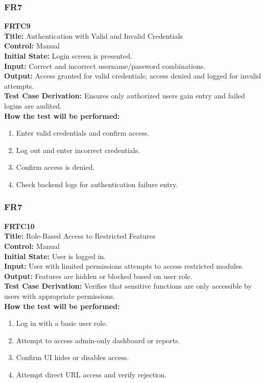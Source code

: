 \documentclass[12pt, titlepage]{article}
\begin{document}
\vspace{1em}
\subsubsection{FR7}
\textbf{FRTC9}\\
\textbf{Title:} Authentication with Valid and Invalid Credentials\\
\textbf{Control:} Manual\\
\textbf{Initial State:} Login screen is presented.\\
\textbf{Input:} Correct and incorrect username/password combinations.\\
\textbf{Output:} Access granted for valid credentials; access denied and logged for invalid attempts.\\
\textbf{Test Case Derivation:} Ensures only authorized users gain entry and failed logins are audited.\\
\textbf{How the test will be performed:}
\begin{enumerate}
  \item Enter valid credentials and confirm access.
  \item Log out and enter incorrect credentials.
  \item Confirm access is denied.
  \item Check backend logs for authentication failure entry.
\end{enumerate}

\vspace{1em}
\subsubsection{FR7}
\textbf{FRTC10}\\
\textbf{Title:} Role-Based Access to Restricted Features\\
\textbf{Control:} Manual\\
\textbf{Initial State:} User is logged in.\\
\textbf{Input:} User with limited permissions attempts to access restricted modules.\\
\textbf{Output:} Features are hidden or blocked based on user role.\\
\textbf{Test Case Derivation:} Verifies that sensitive functions are only accessible by users with appropriate permissions.\\
\textbf{How the test will be performed:}
\begin{enumerate}
  \item Log in with a basic user role.
  \item Attempt to access admin-only dashboard or reports.
  \item Confirm UI hides or disables access.
  \item Attempt direct URL access and verify rejection.
\end{enumerate}
\end{document}
